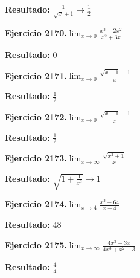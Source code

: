 \documentclass[10pt,a4paper]{article}
\begin{document}
\begin{solbox}
\textbf{Resultado:} \(\displaystyle \frac{1}{\sqrt{x}+1} \to \frac{1}{2}\)
\end{solbox}

\begin{ejbox}
\textbf{Ejercicio 2170.}\quad $\lim_{x\to 0} \frac{x^3-2x^2}{x^2+3x}$
\end{ejbox}

\begin{solbox}
\textbf{Resultado:} \(\displaystyle 0\)
\end{solbox}

\newpage
\begin{ejbox}
\textbf{Ejercicio 2171.}\quad $\lim_{x\to 0} \frac{\sqrt{x+1}-1}{x}$
\end{ejbox}

\begin{solbox}
\textbf{Resultado:} \(\displaystyle \frac{1}{2}\)
\end{solbox}

\begin{ejbox}
\textbf{Ejercicio 2172.}\quad $\lim_{x\to 0} \frac{\sqrt{x+1}-1}{x}$
\end{ejbox}

\begin{solbox}
\textbf{Resultado:} \(\displaystyle \frac{1}{2}\)
\end{solbox}

\begin{ejbox}
\textbf{Ejercicio 2173.}\quad $\lim_{x\to \infty} \frac{\sqrt{x^2+1}}{x}$
\end{ejbox}

\begin{solbox}
\textbf{Resultado:} \(\displaystyle \sqrt{1+\frac{1}{x^2}} \to 1\)
\end{solbox}

\newpage
\begin{ejbox}
\textbf{Ejercicio 2174.}\quad $\lim_{x\to 4} \frac{x^3-64}{x-4}$
\end{ejbox}

\begin{solbox}
\textbf{Resultado:} \(\displaystyle 48\)
\end{solbox}

\begin{ejbox}
\textbf{Ejercicio 2175.}\quad $\lim_{x\to \infty} \frac{4x^3 - 3x}{4x^3 + x^2 - 3}$
\end{ejbox}

\begin{solbox}
\textbf{Resultado:} \(\displaystyle \frac{4}{4}\)
\end{solbox}
\end{document}
